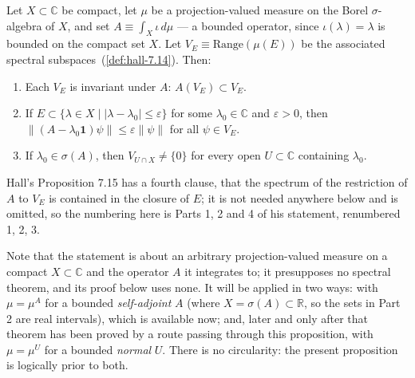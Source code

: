 \begin{proposition}
    \label{prpstn:hall-7.15}
    \leanok
    Let $X \subset \mathbb{C}$ be compact, let $\mu$ be a projection-valued measure on the Borel $\sigma$-algebra of $X$, and set $A \equiv \int_X \iota \, d\mu$ — a bounded operator, since $\iota(\lambda) = \lambda$ is bounded on the compact set $X$. Let $V_E \equiv \text{Range}(\mu(E))$ be the associated spectral subspaces~(\ref{def:hall-7.14}). Then:
    \begin{enumerate}
        \item Each $V_E$ is invariant under $A$: $A(V_E) \subset V_E$.
        \item If $E \subset \{ \lambda \in X \mid \lvert \lambda - \lambda_0 \rvert \le \varepsilon \}$ for some $\lambda_0 \in \mathbb{C}$ and $\varepsilon > 0$, then $\left\| (A - \lambda_0\mathbf{1})\psi \right\| \le \varepsilon \left\| \psi \right\|$ for all $\psi \in V_E$.
        \item If $\lambda_0 \in \sigma(A)$, then $V_{U \cap X} \ne \{0\}$ for every open $U \subset \mathbb{C}$ containing $\lambda_0$.
    \end{enumerate}
    Hall's Proposition 7.15 has a fourth clause, that the spectrum of the restriction of $A$ to $V_E$ is contained in the closure of $E$; it is not needed anywhere below and is omitted, so the numbering here is Parts 1, 2 and 4 of his statement, renumbered 1, 2, 3.

    Note that the statement is about an arbitrary projection-valued measure on a compact $X \subset \mathbb{C}$ and the operator $A$ it integrates to; it presupposes no spectral theorem, and its proof below uses none. It will be applied in two ways: with $\mu = \mu^A$ for a bounded \textit{self-adjoint} $A$ (where $X = \sigma(A) \subset \mathbb{R}$, so the sets in Part 2 are real intervals), which is available now; and, later and only after that theorem has been proved by a route passing through this proposition, with $\mu = \mu^U$ for a bounded \textit{normal} $U$. There is no circularity: the present proposition is logically prior to both.
\end{proposition}
